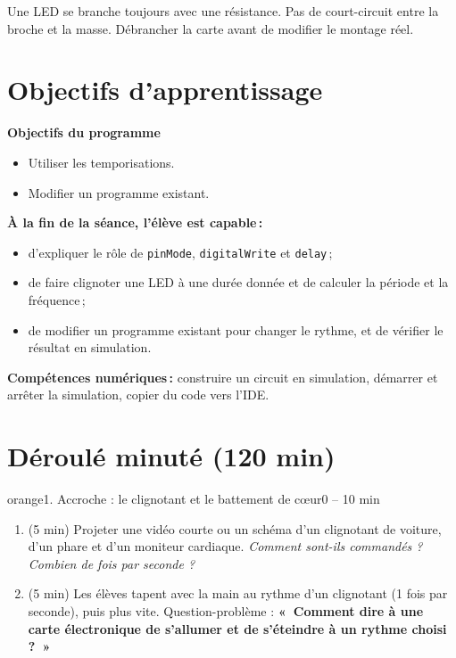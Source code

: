 \documentclass[11pt,a4paper]{article}
\begin{document}
\begin{astuce}
Une LED se branche toujours avec une résistance. Pas de court-circuit entre la broche et la masse. Débrancher la carte avant de modifier le montage réel.
\end{astuce}

\section{Objectifs d'apprentissage}
\begin{tcolorbox}[colback=gray!8,colframe=gray!60!black,arc=1mm,boxrule=0.5pt]
\textbf{Objectifs du programme}
\begin{itemize}
 \item Utiliser les temporisations.
 \item Modifier un programme existant.
\end{itemize}
\textbf{À la fin de la séance, l'élève est capable\,:}
\begin{itemize}
 \item d'expliquer le rôle de \texttt{pinMode}, \texttt{digitalWrite} et \texttt{delay}\,;
 \item de faire clignoter une LED à une durée donnée et de calculer la période et la fréquence\,;
 \item de modifier un programme existant pour changer le rythme, et de vérifier le résultat en simulation.
\end{itemize}
\textbf{Compétences numériques\,:} construire un circuit en simulation, démarrer et arrêter la simulation, copier du code vers l'IDE.
\end{tcolorbox}

\section{Déroulé minuté (120 min)}

\begin{etape}{orange}{1. Accroche : le clignotant et le battement de c\oe ur}{0 -- 10 min}
\begin{enumerate}
 \item (5 min) Projeter une vidéo courte ou un schéma d'un clignotant de voiture, d'un phare et d'un moniteur cardiaque. \emph{Comment sont-ils commandés ? Combien de fois par seconde ?}
 \item (5 min) Les élèves tapent avec la main au rythme d'un clignotant (1 fois par seconde), puis plus vite. Question-problème : \textbf{«~Comment dire à une carte électronique de s'allumer et de s'éteindre à un rythme choisi ?~»}
\end{enumerate}
\end{etape}
\end{document}
